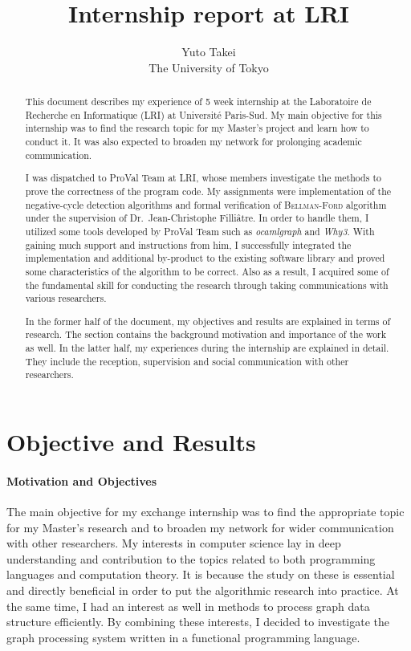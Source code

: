 \documentclass[a4paper,10.5pt]{article}
\title{Internship report at LRI}
\author{Yuto Takei \\ The University of Tokyo }
\begin{document}
\maketitle

\begin{abstract}

This document describes my experience of 5 week internship at the
Laboratoire de Recherche en Informatique (LRI) at Universit\'e
Paris-Sud. My main objective for this internship was to find the
research topic for my Master's project and learn how to conduct it. It
was also expected to broaden my network for prolonging academic
communication.

I was dispatched to ProVal Team at LRI, whose members investigate the
methods to prove the correctness of the program code. My assignments
were implementation of the negative-cycle detection algorithms and
formal verification of \textsc{Bellman-Ford} algorithm under the
supervision of Dr.\ Jean-Christophe Filli\^atre. In order to handle
them, I utilized some tools developed by ProVal Team such as
\emph{ocamlgraph} and \emph{Why3}.  With gaining much support and
instructions from him, I successfully integrated the implementation
and additional by-product to the existing software library and proved
some characteristics of the algorithm to be correct. Also as a result,
I acquired some of the fundamental skill for conducting the research
through taking communications with various researchers.

In the former half of the document, my objectives and results are
explained in terms of research. The section contains the background
motivation and importance of the work as well. In the latter half, my
experiences during the internship are explained in detail. They
include the reception, supervision and social communication with other
researchers.

\end{abstract}

\newpage

\section{Objective and Results}

\paragraph{Motivation and Objectives}

The main objective for my exchange internship was to find the
appropriate topic for my Master's research and to broaden my network
for wider communication with other researchers. My interests in
computer science lay in deep understanding and contribution to the
topics related to both programming languages and computation
theory. It is because the study on these is essential and directly
beneficial in order to put the algorithmic research into practice. At
the same time, I had an interest as well in methods to process graph
data structure efficiently. By combining these interests, I decided to
investigate the graph processing system written in a functional
programming language.
\end{document}
